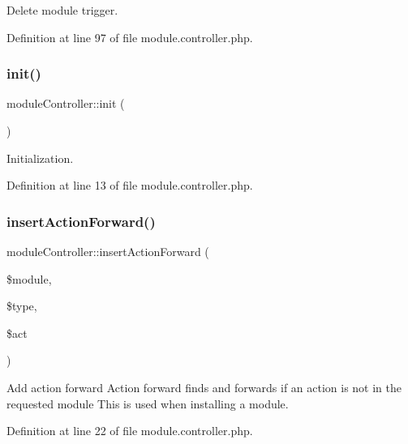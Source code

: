 Delete module trigger. 



Definition at line 97 of file module.\+controller.\+php.

\hypertarget{classmoduleController_a589d3d74f4601ae495a33d001ad8ffa0}{}\label{classmoduleController_a589d3d74f4601ae495a33d001ad8ffa0} 
\subsubsection{\texorpdfstring{init()}{init()}}
{\footnotesize\ttfamily module\+Controller\+::init (\begin{DoxyParamCaption}{ }\end{DoxyParamCaption})}



Initialization. 



Definition at line 13 of file module.\+controller.\+php.

\hypertarget{classmoduleController_a9a5ff2def7412c659594c62a4615a0cd}{}\label{classmoduleController_a9a5ff2def7412c659594c62a4615a0cd} 
\subsubsection{\texorpdfstring{insert\+Action\+Forward()}{insertActionForward()}}
{\footnotesize\ttfamily module\+Controller\+::insert\+Action\+Forward (\begin{DoxyParamCaption}\item[{}]{\$module,  }\item[{}]{\$type,  }\item[{}]{\$act }\end{DoxyParamCaption})}



Add action forward Action forward finds and forwards if an action is not in the requested module This is used when installing a module. 



Definition at line 22 of file module.\+controller.\+php.

\hypertarget{classmoduleController_af50247418fd7c87424958e95ea466b00}{}\label{classmoduleController_af50247418fd7c87424958e95ea466b00} 
